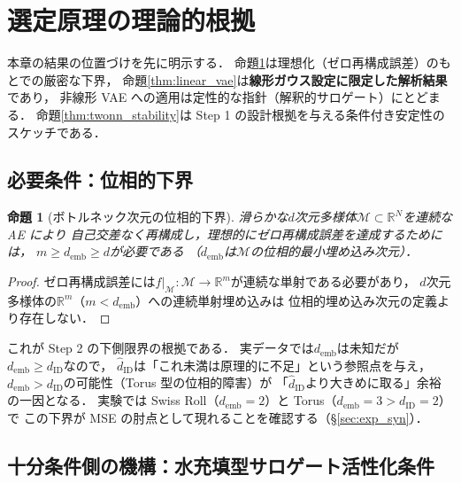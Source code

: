 \documentclass[11pt,a4paper]{jsarticle}
\newtheorem{proposition}{命題}
\newcommand{\dID}{d_{\mathrm{ID}}}
\newcommand{\hatdID}{\hat{d}_{\mathrm{ID}}}
\newcommand{\R}{\mathbb{R}}
\newcommand{\demb}{d_{\mathrm{emb}}}
\begin{document}
\section{選定原理の理論的根拠}\label{sec:theory}

本章の結果の位置づけを先に明示する．
命題\ref{thm:lower_bound}は理想化（ゼロ再構成誤差）のもとでの厳密な下界，
命題\ref{thm:linear_vae}は\textbf{線形ガウス設定に限定した解析結果}であり，
非線形 VAE への適用は定性的な指針（解釈的サロゲート）にとどまる．
命題\ref{thm:twonn_stability}は Step 1 の設計根拠を与える条件付き安定性のスケッチである．

\subsection{必要条件：位相的下界}\label{sec:theory_lower}

\begin{proposition}[ボトルネック次元の位相的下界]\label{thm:lower_bound}
滑らかな$d$次元多様体$\mathcal{M} \subset \R^N$を連続な AE により
自己交差なく再構成し，理想的にゼロ再構成誤差を達成するためには，
$m \geq \demb \geq d$が必要である
（$\demb$は$\mathcal{M}$の位相的最小埋め込み次元）．
\end{proposition}

\begin{proof}
ゼロ再構成誤差には$f|_\mathcal{M}: \mathcal{M} \to \R^m$が連続な単射である必要があり，
$d$次元多様体の$\R^m$（$m < \demb$）への連続単射埋め込みは
位相的埋め込み次元の定義より存在しない\cite{hatcher2002algebraic}．
\end{proof}

これが Step 2 の下側限界の根拠である．
実データでは$\demb$は未知だが$\demb \geq \dID$なので，
$\hatdID$は「これ未満は原理的に不足」という参照点を与え，
$\demb > \dID$の可能性（Torus 型の位相的障害）が
「$\hatdID$より大きめに取る」余裕の一因となる．
実験では Swiss Roll（$\demb = 2$）と Torus（$\demb = 3 > \dID = 2$）で
この下界が MSE の肘点として現れることを確認する（§\ref{sec:exp_syn}）．

\subsection{十分条件側の機構：水充填型サロゲート活性化条件}\label{sec:theory_wf}
\end{document}
